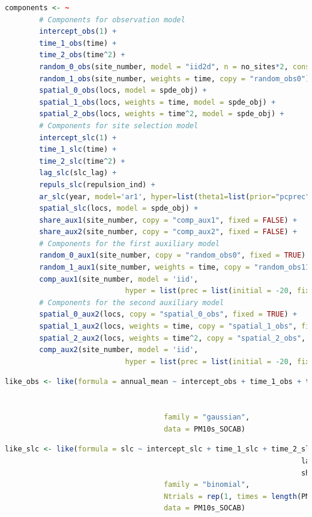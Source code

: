 \begin{lstlisting}[language = R]
	components <- ~ 
		# Components for observation model
		intercept_obs(1) +   
		time_1_obs(time) +  
		time_2_obs(time^2) +  
		random_0_obs(site_number, model = "iid2d", n = no_sites*2, constr=TRUE) +  
		random_1_obs(site_number, weights = time, copy = "random_obs0") +  
		spatial_0_obs(locs, model = spde_obj) +  
		spatial_1_obs(locs, weights = time, model = spde_obj) +  
		spatial_2_obs(locs, weights = time^2, model = spde_obj) +    
		# Components for site selection model  
		intercept_slc(1) + 
		time_1_slc(time) +  
		time_2_slc(time^2) +  
		lag_slc(slc_lag) +  
		repuls_slc(repulsion_ind) + 
		ar_slc(year, model='ar1', hyper=list(theta1=list(prior="pcprec",param=c(2, 0.01)))) +  
		spatial_slc(locs, model = spde_obj) +  
		share_aux1(site_number, copy = "comp_aux1", fixed = FALSE) +   
		share_aux2(site_number, copy = "comp_aux2", fixed = FALSE) +    
		# Components for the first auxiliary model  
		random_0_aux1(site_number, copy = "random_obs0", fixed = TRUE) +  
		random_1_aux1(site_number, weights = time, copy = "random_obs11", fixed = TRUE) +  
		comp_aux1(site_number, model = 'iid', 
							hyper = list(prec = list(initial = -20, fixed=TRUE))) +    
		# Components for the second auxiliary model  
		spatial_0_aux2(locs, copy = "spatial_0_obs", fixed = TRUE) +  
		spatial_1_aux2(locs, weights = time, copy = "spatial_1_obs", fixed = TRUE) +  
		spatial_2_aux2(locs, weights = time^2, copy = "spatial_2_obs", fixed = TRUE) +  
		comp_aux2(site_number, model = 'iid', 
							hyper = list(prec = list(initial = -20, fixed=TRUE)))
\end{lstlisting} \label{code:inlabru_components}

\begin{lstlisting}[language = R]
	like_obs <- like(formula = annual_mean ~ intercept_obs + time_1_obs + time_2_obs +     
																					 random_0_obs + random_1_obs + 
																					 spatial_0_obs + spatial_1_obs + spatial_2_obs,  
									 family = "gaussian",  
									 data = PM10s_SOCAB)
\end{lstlisting} \label{code:inlabru_lik_obs}

\begin{lstlisting}[language = R]
	like_slc <- like(formula = slc ~ intercept_slc + time_1_slc + time_2_slc +     
																	 lag_slc + repuls_slc + ar_slc + spatial_slc +     
																	 share_aux1 + share_aux2,  
									 family = "binomial",  
									 Ntrials = rep(1, times = length(PM10s_SOCAB$slc)),  
									 data = PM10s_SOCAB)
\end{lstlisting} \label{code:inlabru_lik_slc}

